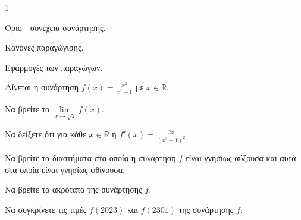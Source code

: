 \begin{ylh}{1}
    \item Όριο - συνέχεια συνάρτησης.
    \item Κανόνες παραγώγισης.
    \item Εφαρμογές των παραγώγων.
\end{ylh}


Δίνεται η συνάρτηση $f(x) = \frac{x^2}{x^2 + 1}$ με $x \in \mathbb{R}$.

\begin{alist}
    \item Να βρείτε το $\lim\limits_{x\to\sqrt{2}} f(x)$. 

    \item Να δείξετε ότι για κάθε $x \in \mathbb{R}$ η $f'(x) = \frac{2x}{(x^2 + 1)^2}$. 

    \item
    \begin{rlist}
        \item Να βρείτε τα διαστήματα στα οποία η συνάρτηση $f$ είναι γνησίως αύξουσα και αυτά στα οποία είναι γνησίως φθίνουσα. 

        \item Να βρείτε τα ακρότατα της συνάρτησης $f$. 
    \end{rlist}

    \item Να συγκρίνετε τις τιμές $f(2023)$ και $f(2301)$ της συνάρτησης $f$. 
\end{alist}

